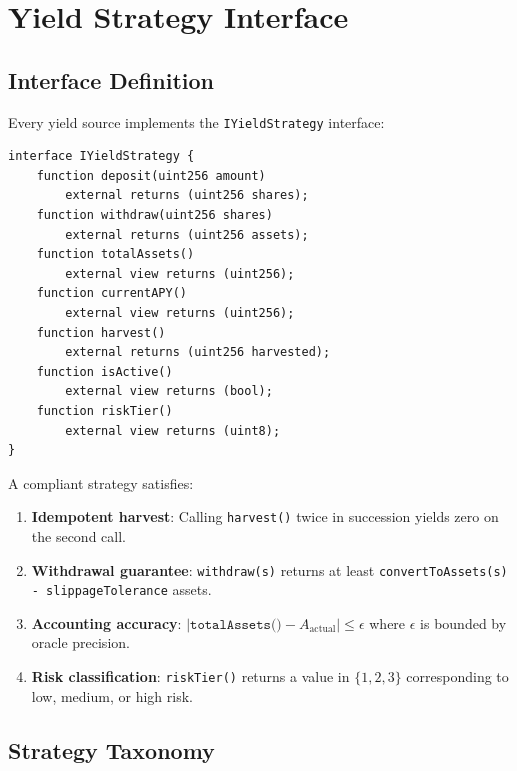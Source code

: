 \section{Yield Strategy Interface}
\label{sec:strategies}

\subsection{Interface Definition}

Every yield source implements the \texttt{IYieldStrategy} interface:

\begin{lstlisting}[language=Solidity,caption=IYieldStrategy interface]
interface IYieldStrategy {
    function deposit(uint256 amount)
        external returns (uint256 shares);
    function withdraw(uint256 shares)
        external returns (uint256 assets);
    function totalAssets()
        external view returns (uint256);
    function currentAPY()
        external view returns (uint256);
    function harvest()
        external returns (uint256 harvested);
    function isActive()
        external view returns (bool);
    function riskTier()
        external view returns (uint8);
}
\end{lstlisting}

\begin{definition}
A compliant strategy satisfies:
\begin{enumerate}[nosep]
  \item \textbf{Idempotent harvest}: Calling \texttt{harvest()} twice in succession yields zero on the second call.
  \item \textbf{Withdrawal guarantee}: \texttt{withdraw(s)} returns at least \texttt{convertToAssets(s) - slippageTolerance} assets.
  \item \textbf{Accounting accuracy}: $|\texttt{totalAssets()} - A_{\text{actual}}| \leq \epsilon$ where $\epsilon$ is bounded by oracle precision.
  \item \textbf{Risk classification}: \texttt{riskTier()} returns a value in $\{1, 2, 3\}$ corresponding to low, medium, or high risk.
\end{enumerate}
\end{definition}

\subsection{Strategy Taxonomy}\label{sec:taxonomy}

